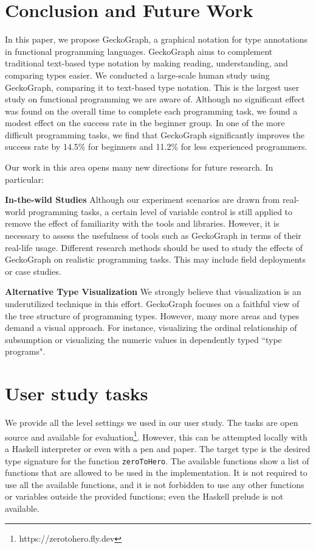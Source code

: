 \documentclass[preprint,12pt]{elsarticle}
\begin{document}
\section{Conclusion and Future Work}
In this paper, we propose GeckoGraph, a graphical notation for type annotations in functional programming languages. GeckoGraph aims to complement traditional text-based type notation by making reading, understanding, and comparing types easier. We conducted a large-scale human study using GeckoGraph, comparing it to text-based type notation. This is the largest user study on functional programming we are aware of. Although no significant effect was found on the overall time to complete each programming task, we found a modest effect on the success rate in the beginner group. In one of the more difficult programming tasks, we find that GeckoGraph significantly improves the success rate by 14.5\% for beginners and 11.2\% for less experienced programmers.

Our work in this area opens many new directions for future research.  In particular:

\noindent\textbf{In-the-wild Studies}
Although our experiment scenarios are drawn from real-world programming tasks, a certain level of variable control is still applied to remove the effect of familiarity with the tools and libraries. However, it is necessary to assess the usefulness of tools such as GeckoGraph in terms of their real-life usage. Different research methods should be used to study the effects of GeckoGraph on realistic programming tasks. This may include field deployments or case studies. 

\noindent\textbf{Alternative Type Visualization}
We strongly believe that visualization is an underutilized technique in this effort. GeckoGraph focuses on a faithful view of the tree structure of programming types. However, many more areas and types demand a visual approach. For instance, visualizing the ordinal relationship of subsumption or visualizing the numeric values in dependently typed ``type programs". 

 


\appendix
\section{User study tasks} \label{levels}
We provide all the level settings we used in our user study. The tasks are open source and available for evaluation\footnote{https://zerotohero.fly.dev}. However, this can be attempted locally with a Haskell interpreter or even with a pen and paper. The target type is the desired type signature for the function \texttt{zeroToHero}. The available functions show a list of functions that are allowed to be used in the implementation. It is not required to use all the available functions, and it is not forbidden to use any other functions or variables outside the provided functions; even the Haskell prelude is not available. 
\end{document}
